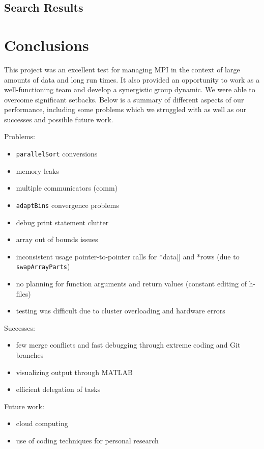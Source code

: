 \documentclass{article}
\begin{document}
\subsection{Search Results}



\section{Conclusions}
This project was an excellent test for managing MPI in the context of large amounts of data and long run times. It also provided an opportunity to work as a well-functioning team and develop a synergistic group dynamic. We were able to overcome significant setbacks. Below is a summary of different aspects of our performance, including some problems which we struggled with as well as our successes and possible future work.

\begin{mdframed}[backgroundcolor=red!20]
	Problems:
	\begin{itemize}
		\item \texttt{parallelSort} conversions
		\item memory leaks
		\item multiple communicators (comm)
		\item \texttt{adaptBins} convergence problems
		\item debug print statement clutter
		\item array out of bounds issues
		\item inconsistent usage pointer-to-pointer calls for *data[] and *rows (due to \texttt{swapArrayParts})
		\item no planning for function arguments and return values (constant editing of h-files)
		\item testing was difficult due to cluster overloading and hardware errors
	\end{itemize}
\end{mdframed}

\begin{mdframed}[backgroundcolor=green!20]
	Successes:
	\begin{itemize}
		\item few merge conflicts and fast debugging through extreme coding and Git branches
		\item visualizing output through MATLAB
		\item efficient delegation of tasks
	\end{itemize}
\end{mdframed}

\begin{mdframed}[backgroundcolor=blue!20]
	Future work:
	\begin{itemize}
		\item cloud computing
		\item use of coding techniques for personal research
	\end{itemize}
\end{mdframed}






\end{document}
